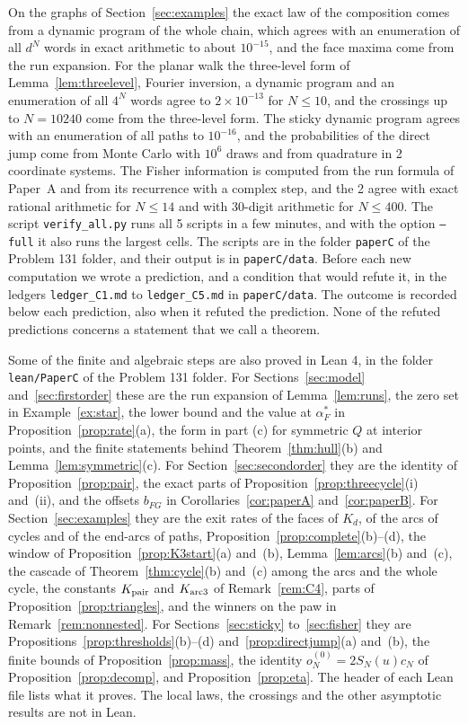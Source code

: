 On the graphs of Section~\ref{sec:examples} the exact law of the composition
comes from a dynamic program of the whole chain, which agrees with an
enumeration of all $d^N$ words in exact arithmetic to about $10^{-15}$, and
the face maxima come from the run expansion. For the planar walk the
three-level form of Lemma~\ref{lem:threelevel}, Fourier inversion, a dynamic
program and an enumeration of all $4^N$ words agree to $2\times10^{-13}$ for
$N\le10$, and the crossings up to $N=10240$ come from the three-level form.
The sticky dynamic program agrees with an enumeration of all paths to
$10^{-16}$, and the probabilities of the direct jump come from Monte Carlo
with $10^6$ draws and from quadrature in 2 coordinate systems. The Fisher
information is computed from the run formula of Paper~A and from its
recurrence with a complex step, and the 2 agree with exact rational
arithmetic for $N\le14$ and with 30-digit arithmetic for $N\le400$. The
script \texttt{verify\_all.py} runs all 5 scripts in a few minutes, and with
the option \texttt{--full} it also runs the largest cells. The scripts are in
the folder \texttt{paperC} of the Problem 131 folder, and their output is in
\texttt{paperC/data}. Before each new computation we wrote a prediction, and
a condition that would refute it, in the ledgers \texttt{ledger\_C1.md} to
\texttt{ledger\_C5.md} in \texttt{paperC/data}. The outcome is recorded below
each prediction, also when it refuted the prediction. None of the refuted
predictions concerns a statement that we call a theorem.

Some of the finite and algebraic steps are also proved in Lean 4, in the
folder \texttt{lean/PaperC} of the Problem 131 folder. For
Sections~\ref{sec:model} and~\ref{sec:firstorder} these are the run
expansion of Lemma~\ref{lem:runs}, the zero set in Example~\ref{ex:star}, the
lower bound and the value at $\alpha^*_F$ in Proposition~\ref{prop:rate}(a),
the form in part (c) for symmetric $Q$ at interior points, and the finite
statements behind Theorem~\ref{thm:hull}(b) and
Lemma~\ref{lem:symmetric}(c). For Section~\ref{sec:secondorder} they are the
identity of Proposition~\ref{prop:pair}, the exact parts of
Proposition~\ref{prop:threecycle}(i) and~(ii), and the offsets $b_{FG}$ in
Corollaries~\ref{cor:paperA} and~\ref{cor:paperB}. For
Section~\ref{sec:examples} they are the exit rates of the faces of $K_d$, of
the arcs of cycles and of the end-arcs of paths,
Proposition~\ref{prop:complete}(b)--(d), the window of
Proposition~\ref{prop:K3start}(a) and~(b), Lemma~\ref{lem:arcs}(b) and~(c),
the cascade of Theorem~\ref{thm:cycle}(b) and~(c) among the arcs and the
whole cycle, the constants $K_{\rm pair}$ and $K_{\rm arc3}$ of
Remark~\ref{rem:C4}, parts of Proposition~\ref{prop:triangles}, and the
winners on the paw in Remark~\ref{rem:nonnested}. For
Sections~\ref{sec:sticky} to~\ref{sec:fisher} they are
Propositions~\ref{prop:thresholds}(b)--(d) and~\ref{prop:directjump}(a)
and~(b), the finite bounds of Proposition~\ref{prop:mass}, the identity
$o^{(0)}_N=2S_N(u)c_N$ of Proposition~\ref{prop:decomp}, and
Proposition~\ref{prop:eta}. The header of each Lean file lists what it
proves. The local laws, the crossings and the other asymptotic results are not
in Lean.

